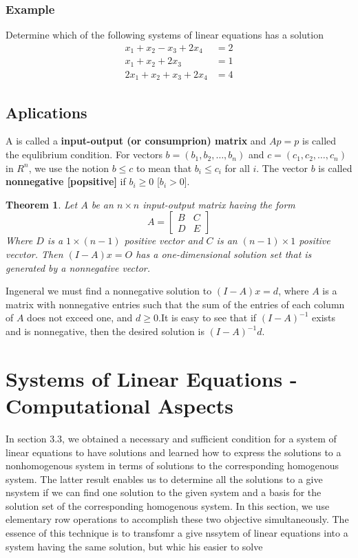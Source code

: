 \documentclass[10pt, oneside]{article}
\newtheorem{thm}{Theorem}
\begin{document}
\subsubsection{Example}
Determine which of the following systems of linear equations has a solution
\[
	\begin{array}{ll}
		x_1 + x_2 - x_3 + 2x_4  & = 2 \\
		x_1 + x_2 + 2x_3 \quad  & = 1 \\
		2x_1 + x_2 + x_3 + 2x_4 & = 4
	\end{array}
\]

\subsection{Aplications}
A is called a \textbf{input-output (or consumprion) matrix} and $Ap = p$ is called the equlibrium condition. For vectors $b = (b_1, b_2, \ldots, b_n)$ and $c = (c_1, c_2, \ldots, c_n)$ in $R^n$, we
use the notion $b \leq c$ to mean that $b_i \leq c_i$ for all $i$. The vector $b$ is called \textbf{nonnegative [popsitive]} if $b_i \geq 0$ [$b_i > 0$].

\begin{thm}
	Let $A$ be an $n \times n$ input-output matrix having the form
	\[
		A = \begin{bmatrix}
			B & C \\
			D & E
		\end{bmatrix}
	\]
	Where  $D$ is a $1 \times (n - 1)$ positive vector and $C$ is an $(n - 1) \times 1$ positive vecvtor. Then $(I - A)x = O$ has a one-dimensional solution set that is generated by a nonnegative vector.
\end{thm}

Ingeneral we must find a nonnegative solution to $(I - A)x = d$, where $A$ is a matrix with nonnegative entries such that the sum of the entries of each column of $A$ does not exceed one, and $d \geq 0$.It is easy to
see that if $(I - A)^{-1}$ exists and is nonnegative, then the desired solution is $(I - A)^{-1}d$.


\section{Systems of Linear Equations - Computational Aspects}

In section 3.3, we obtained a necessary and sufficient condition for a system of linear equations to have solutions and learned how to express the solutions to a nonhomogenous system in terms of solutions
to the corresponding homogenous system. The latter result enables us to determine all the solutions to a give nsystem if we can find one solution to the given system and a basis for the solution set
of the corresponding homogenous system. In this section, we use elementary row operations to accomplish these two objective simultaneously. The essence of this technique is to transfomr a give nssytem
of linear equations into a system having the same solution, but whic his easier to solve
\end{document}
